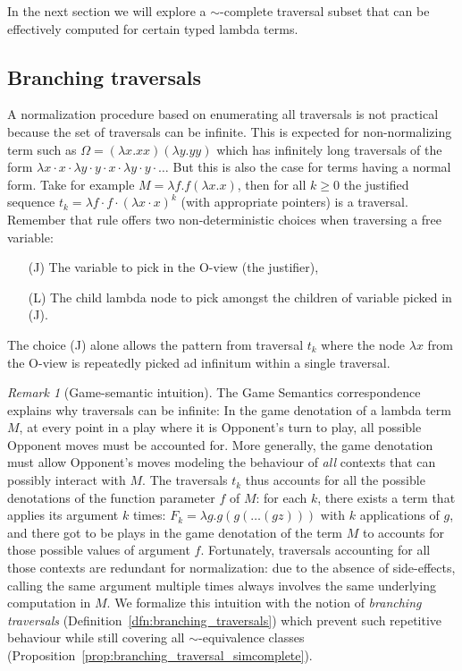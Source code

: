 \documentclass{elsarticle}
\theoremstyle{plain}
\theoremstyle{definition}
\theoremstyle{remark}
\newtheorem{remark}{Remark}[section]
\begin{document}
In the next section we will explore a $\sim$-complete traversal subset that can be effectively computed for certain typed lambda terms.

\subsection{Branching traversals}

A normalization procedure based on enumerating all traversals is not practical because the set of traversals can be infinite. This is expected for non-normalizing term such as $\Omega = (\lambda x. x x)(\lambda y. y y)$ which has infinitely long traversals of the form $\lambda x \cdot x \cdot \lambda y \cdot y \cdot x \cdot \lambda y \cdot y \cdot \ldots$ But this is also the case for terms having a normal form. Take for example $M = \lambda f . f (\lambda x. x)$, then for all $k\geq0$ the justified sequence $t_k = \lambda f \cdot f \cdot (\lambda x \cdot  x)^k$ (with appropriate pointers) is a traversal.
Remember that rule  offers two non-deterministic choices when traversing a free variable:
\begin{itemize}
\item[(J)] The variable to pick in the O-view (the justifier),
\item[(L)] The child lambda node to pick amongst the children of variable picked in (J).
\end{itemize}
The choice (J) alone allows the pattern from traversal $t_k$ where the node $\lambda x$ from the O-view is repeatedly picked ad infinitum within a single traversal.

\begin{remark}[Game-semantic intuition]
The Game Semantics correspondence explains why traversals can be infinite: In the game denotation of a lambda term $M$, at every point in a play where it is Opponent's turn to play, all possible Opponent moves must be accounted for. More generally, the game denotation must allow Opponent's moves modeling the behaviour of \emph{all} contexts that can possibly interact with $M$. The traversals $t_k$ thus accounts for all the possible denotations of the function parameter $f$ of $M$: for each $k$, there exists a term that applies its argument $k$ times: $F_k = \lambda g . g (g ( \ldots (g z)))$ with $k$ applications of $g$, and there got to be plays in the game denotation of the term $M$ to accounts for those possible values of argument $f$. Fortunately, traversals accounting for all those contexts are redundant for normalization: due to the absence of side-effects, calling the same argument multiple times always involves the same underlying computation in $M$. We formalize this intuition with the notion of \emph{branching traversals} (Definition~\ref{dfn:branching_traversals})  which prevent such repetitive behaviour while still covering all $\sim$-equivalence classes (Proposition~\ref{prop:branching_traversal_simcomplete}).
\end{remark}
\end{document}
